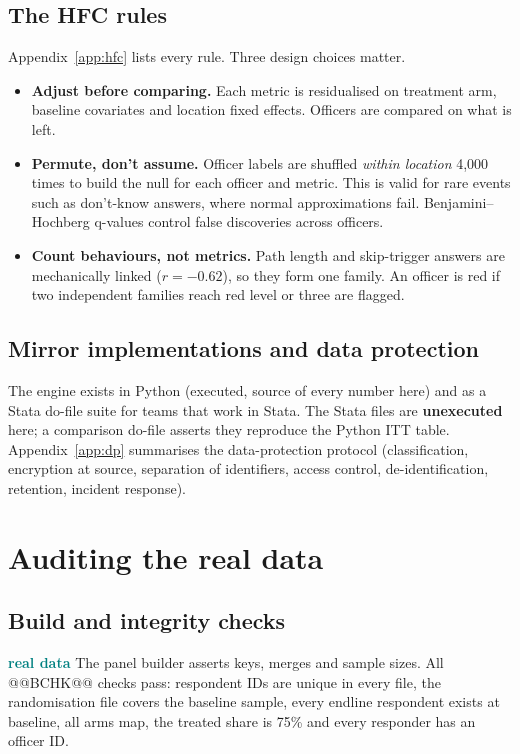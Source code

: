 \documentclass[11pt,a4paper]{article}
\newcommand{\real}{\textcolor{teal}{\sffamily\bfseries real data}}
\begin{document}
\subsection{The HFC rules}
Appendix~\ref{app:hfc} lists every rule. Three design choices matter.
\begin{itemize}
\item \textbf{Adjust before comparing.} Each metric is residualised on treatment arm, baseline covariates and location fixed effects. Officers are compared on what is left.
\item \textbf{Permute, don't assume.} Officer labels are shuffled \emph{within location} 4,000 times to build the null for each officer and metric. This is valid for rare events such as don't-know answers, where normal approximations fail. Benjamini--Hochberg q-values control false discoveries across officers.
\item \textbf{Count behaviours, not metrics.} Path length and skip-trigger answers are mechanically linked ($r=-0.62$), so they form one family. An officer is red if two independent families reach red level or three are flagged.
\end{itemize}

\subsection{Mirror implementations and data protection}
The engine exists in Python (executed, source of every number here) and as a Stata do-file suite for teams that work in Stata. The Stata files are \textbf{unexecuted} here; a comparison do-file asserts they reproduce the Python ITT table. Appendix~\ref{app:dp} summarises the data-protection protocol (classification, encryption at source, separation of identifiers, access control, de-identification, retention, incident response).

\section{Auditing the real data}\label{sec:audit}
\subsection{Build and integrity checks}
\real{} The panel builder asserts keys, merges and sample sizes. All @@BCHK@@ checks pass: respondent IDs are unique in every file, the randomisation file covers the baseline sample, every endline respondent exists at baseline, all arms map, the treated share is 75\% and every responder has an officer ID.
\end{document}
